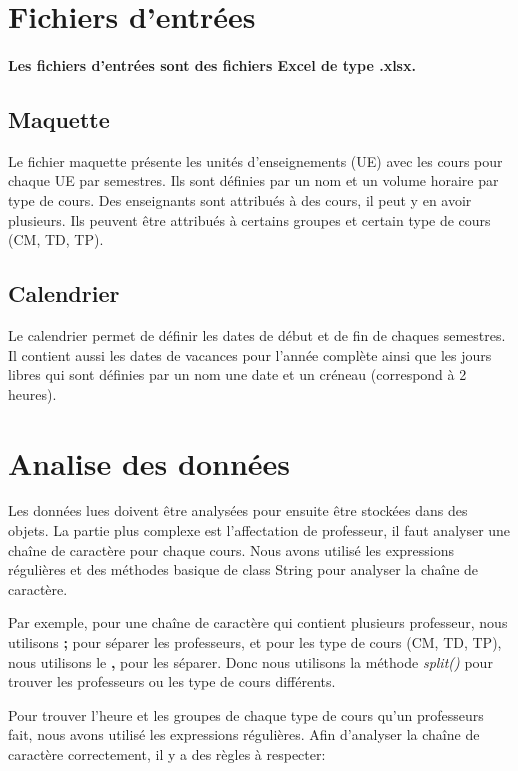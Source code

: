 \documentclass{polytech/polytech}
\begin{document}
	\section{Fichiers d'entrées}

	\paragraph{Les fichiers d'entrées sont des fichiers Excel de type .xlsx.}

	\subsection{Maquette}

	Le fichier maquette présente les unités d'enseignements (UE) avec les cours pour chaque UE par semestres.
	Ils sont définies par un nom et un volume horaire par type de cours.
	Des enseignants sont attribués à des cours, il peut y en avoir plusieurs.
	Ils peuvent être attribués à certains groupes et certain type de cours (CM, TD, TP).

	\subsection{Calendrier}

	Le calendrier permet de définir les dates de début et de fin de chaques semestres.
	Il contient aussi les dates de vacances pour l'année complète ainsi que les jours libres qui sont définies par un nom une date et un créneau (correspond à 2 heures).

	\section{Analise des données}
	Les données lues doivent être analysées pour ensuite être stockées dans des objets.
	La partie plus complexe est l'affectation de professeur, il faut analyser une chaîne de caractère pour chaque cours.
	Nous avons utilisé les expressions régulières et des méthodes basique de class String pour analyser la chaîne de caractère.

	Par exemple, pour une chaîne de caractère qui contient plusieurs professeur, nous utilisons \textbf{;} pour séparer les professeurs,
	et pour les type de cours (CM, TD, TP), nous utilisons le \textbf{,} pour les séparer.
	Donc nous utilisons la méthode \textit{split()} pour trouver les professeurs ou les type de cours différents.

	Pour trouver l'heure et les groupes de chaque type de cours qu'un professeurs fait, nous avons utilisé les expressions régulières.
	Afin d'analyser la chaîne de caractère correctement, il y a des règles à respecter:
\end{document}

